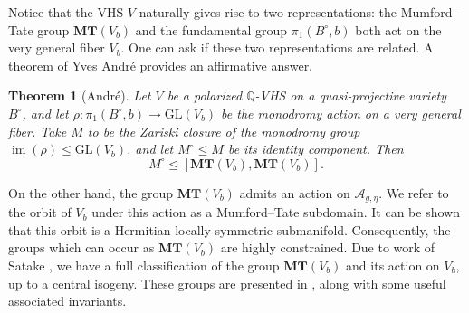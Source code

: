 \documentclass[12pt]{amsart}
\newcommand{\Q}{\mathbb{Q}}
\newcommand{\cA}{\mathcal{A}}
\newcommand{\GL}{\mathrm{GL}}
\DeclareMathOperator{\im}{\mathrm{im}}
\newtheorem{theorem}{Theorem}[section]
\theoremstyle{definition}
\numberwithin{equation}{section}
\begin{document}
Notice that the VHS \(V\) naturally gives rise to two representations:
the Mumford--Tate group \(\mathbf{MT}(V_b)\) and the fundamental group \(\pi_1(B^\circ, b)\)
both act on the very general fiber \(V_b\). One can ask if these two representations 
are related. A theorem of Yves Andr\'e provides an affirmative answer.

\begin{theorem}[Andr\'e]
    Let \(V\) be a polarized \(\Q\)-VHS on a quasi-projective variety \(B^\circ\), 
    and let \(\rho: \pi_1(B^\circ, b) \to \GL(V_b)\) be the monodromy action on a 
    very general fiber. Take \(M\) to be the Zariski closure of the monodromy group 
    \(\im(\rho) \leq \GL(V_b)\), and let \(M^\circ \leq M\) be its identity component.
    Then \[M^\circ \trianglelefteq [\mathbf{MT}(V_b), \mathbf{MT}(V_b)].\]
\end{theorem}


On the other hand, the group \(\mathbf{MT}(V_b)\) admits an action on \(\cA_{g, \eta}\). 
We refer to the orbit of \(V_b\) under this action as a Mumford--Tate subdomain. It 
can be shown that this orbit is a Hermitian locally symmetric submanifold. Consequently, 
the groups which can occur as \(\mathbf{MT}(V_b)\) are highly
constrained. Due to work of Satake \cite{satake67}, we have a full classification of 
the group \(\mathbf{MT}(V_b)\) and its action on \(V_b\), up to a central isogeny. 
These groups are presented in , along with some useful associated
invariants.
\end{document}
